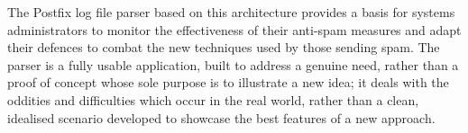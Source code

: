 \documentclass[draft]{svmult}
\begin{document}
The Postfix log file parser based on this architecture provides a basis for
systems administrators to monitor the effectiveness of their anti-spam
measures and adapt their defences to combat the new techniques used by
those sending spam.  The parser is a fully usable application, built to
address a genuine need, rather than a proof of concept whose sole purpose
is to illustrate a new idea; it deals with the oddities and difficulties
which occur in the real world, rather than a clean, idealised scenario
developed to showcase the best features of a new approach.



\end{document}
